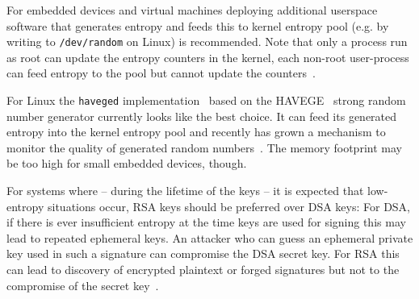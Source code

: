 For embedded devices and virtual machines deploying additional userspace
software that generates entropy and feeds this to kernel entropy pool
(e.g. by writing to \verb+/dev/random+ on Linux) is recommended. Note
that only a process run as root can update the entropy counters in the
kernel, each non-root user-process can feed entropy to the pool but
cannot update the counters~\cite{Wikipedia:/dev/random}.

For Linux the \verb+haveged+
implementation~\cite{HAV13a} based on the HAVEGE~\cite{SS03}
strong random number generator currently looks like the best choice. It
can feed its generated entropy into the kernel entropy pool and recently
has grown a mechanism to monitor the quality of generated random
numbers~\cite{HAV13b}. The memory footprint may be too high for small
embedded devices, though.

For systems where -- during the lifetime of the keys -- it is expected
that low-entropy situations occur, RSA keys should be preferred over DSA
keys: For DSA, if there is ever insufficient entropy at the time keys
are used for signing this may lead to repeated ephemeral keys. An
attacker who can guess an ephemeral private key used in such a signature
can compromise the DSA secret key.
For RSA this can lead to discovery of encrypted plaintext or forged
signatures but not to the compromise of the secret key~\cite{HDWH12}.
